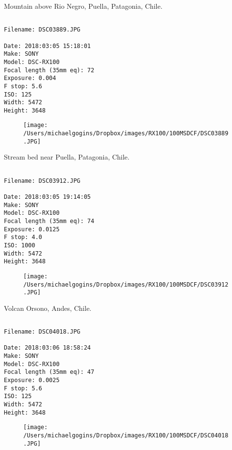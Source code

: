 \clearpage
\onecolumn
\noindent Mountain above Rio Negro, Puella, Patagonia, Chile.
\noindent
\begin{lstlisting}

Filename: DSC03889.JPG

Date: 2018:03:05 15:18:01
Make: SONY
Model: DSC-RX100
Focal length (35mm eq): 72
Exposure: 0.004
F stop: 5.6
ISO: 125
Width: 5472
Height: 3648
\end{lstlisting}
\clearpage

\begin{figure}
\texttt{[image: /Users/michaelgogins/Dropbox/images/RX100/100MSDCF/DSC03889.JPG]}
\end{figure}
    
\clearpage
\onecolumn
\noindent Stream bed near Puella, Patagonia, Chile.
\noindent
\begin{lstlisting}

Filename: DSC03912.JPG

Date: 2018:03:05 19:14:05
Make: SONY
Model: DSC-RX100
Focal length (35mm eq): 74
Exposure: 0.0125
F stop: 4.0
ISO: 1000
Width: 5472
Height: 3648
\end{lstlisting}
\clearpage

\begin{figure}
\texttt{[image: /Users/michaelgogins/Dropbox/images/RX100/100MSDCF/DSC03912.JPG]}
\end{figure}
    
\clearpage
\onecolumn
\noindent Volcan Orsono, Andes, Chile.
\noindent
\begin{lstlisting}

Filename: DSC04018.JPG

Date: 2018:03:06 18:58:24
Make: SONY
Model: DSC-RX100
Focal length (35mm eq): 47
Exposure: 0.0025
F stop: 5.6
ISO: 125
Width: 5472
Height: 3648
\end{lstlisting}
\clearpage

\begin{figure}
\texttt{[image: /Users/michaelgogins/Dropbox/images/RX100/100MSDCF/DSC04018.JPG]}
\end{figure}
    

